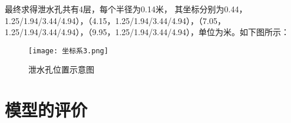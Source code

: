 \documentclass[withoutpreface,bwprint]{cumcmthesis}
\begin{document}
最终求得泄水孔共有4层，每个半径为0.14米，
其坐标分别为0.44，1.25/1.94/3.44/4.94），（4.15，1.25/1.94/3.44/4.94），（7.05，
1.25/1.94/3.44/4.94），（9.95，1.25/1.94/3.44/4.94），单位为米。如下图所示：

    \begin{figure}[H]
        \centering
        \texttt{[image: 坐标系3.png]}
        \caption{泄水孔位置示意图}
        \label{fig:单图}
    \end{figure}














\section{模型的评价}
\end{document}
